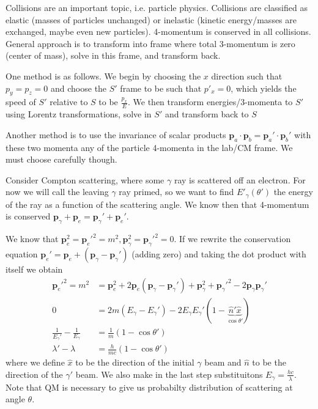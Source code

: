 \documentclass[10pt]{report}
\begin{document}
Collisions are an important topic, i.e. particle physics. Collisions are classified as elastic (masses of particles unchanged) or inelastic (kinetic energy/masses are exchanged, maybe even new particles). 4-momentum is conserved in all collisions. General approach is to transform into frame where total 3-momentum is zero (center of mass), solve in this frame, and transform back.

One method is as follows. We begin by choosing the $x$ direction such that $p_y = p_z = 0$ and choose the $S'$ frame to be such that $p'_x = 0$, which yields the speed of $S'$ relative to $S$ to be $\frac{p_x}{E}$. We then transform energies/3-momenta to $S'$ using Lorentz transformations, solve in $S'$ and transform back to $S$

Another method is to use the invariance of scalar products $\mathbf{p}_a \cdot \mathbf{p}_b = \mathbf{p}_a' \cdot \mathbf{p}_b'$ with these two momenta any of the particle 4-momenta in the lab/CM frame. We must choose carefully though.

Consider Compton scattering, where some $\gamma$ ray is scattered off an electron. For now we will call the leaving $\gamma$ ray primed, so we want to find $E'_\gamma(\theta')$ the energy of the ray as a function of the scattering angle. We know then that 4-momentum is conserved $\mathbf{p}_\gamma + \mathbf{p}_e = \mathbf{p}_\gamma' + \mathbf{p}_e'$.

We know that $\mathbf{p}_e^2 = \mathbf{p}_e'^2 = m^2, \mathbf{p}_\gamma^2 = \mathbf{p}_\gamma'^2 = 0$. If we rewrite the conservation equation $\mathbf{p}_e' = \mathbf{p}_e + (\mathbf{p}_\gamma - \mathbf{p}_\gamma')$ (adding zero) and taking the dot product with itself we obtain
\begin{align}
    \mathbf{p}_e'^2 = m^2 &= \mathbf{p}_e^2 + 2\mathbf{p}_e(\mathbf{p}_\gamma - \mathbf{p}_\gamma') + \mathbf{p}_\gamma^2 + \mathbf{p}_\gamma'^2 - 2\mathbf{p}_\gamma\mathbf{p}_\gamma'\\
    0 &= 2m(E_\gamma - E_\gamma') - 2E_\gamma E_\gamma'(1-\underbrace{\hat{n}'\hat{x}}_{\cos \theta'})\\
    \frac{1}{E_\gamma'} - \frac{1}{E_\gamma} &= \frac{1}{m}\left(1 - \cos \theta'  \right)\\
    \lambda' - \lambda &= \frac{h}{mc}\left( 1-\cos\theta' \right)
    \label{1.14.scattering}
\end{align}
where we define $\hat{x}$ to be the direction of the initial $\gamma$ beam and $\hat{n}$ to be the direction of the $\gamma'$ beam. We also make in the last step substituitons $E_\gamma = \frac{hc}{\lambda}$. Note that QM is necessary to give us probabilty distribution of scattering at angle $\theta$.
\end{document}
